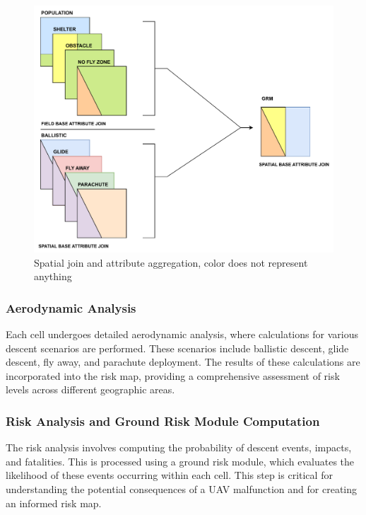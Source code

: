 \documentclass[12pt]{report}
\begin{document}
        \begin{figure}[H]
            \centering
            \includegraphics[width=\textwidth]{General Image/OSM Drone-Attribute.pdf}
            \caption{Spatial join and attribute aggregation, color does not represent anything}
            \label{fig:sjoin}
        \end{figure}

            
        \subsubsection{Aerodynamic Analysis}
        Each cell undergoes detailed aerodynamic analysis, where calculations for various descent scenarios are
        performed. These scenarios include ballistic descent, glide descent, fly away, and parachute deployment. The
        results of these calculations are incorporated into the risk map, providing a comprehensive assessment of risk
        levels across different geographic areas.
            
        \subsubsection{Risk Analysis and Ground Risk Module Computation}
        The risk analysis involves computing the probability of descent events, impacts, and fatalities. This is
        processed using a ground risk module, which evaluates the likelihood of these events occurring within each cell.
        This step is critical for understanding the potential consequences of a UAV malfunction and for creating an
        informed risk map.
            
\end{document}
